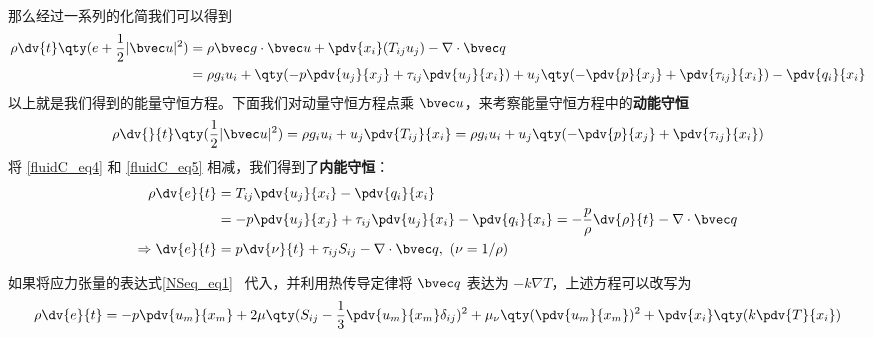 那么经过一系列的化简我们可以得到
\begin{equation}\label{fluidC_eq4}
\begin{aligned}
\rho \dv{t} \qty(e+\frac{1}{2}|\bvec u|^2)&=\rho \bvec g\cdot \bvec u+\pdv{x_i} (T_{ij}u_j)-\nabla\cdot \bvec q\\
&=\rho g_iu_i+\qty(-p\pdv{u_j}{x_j}+\tau_{ij}\pdv{u_j}{x_i})+u_j\qty(-\pdv{p}{x_j}+\pdv{\tau_{ij}}{x_i})-\pdv{q_i}{x_i}
\end{aligned}
\end{equation}
以上就是我们得到的能量守恒方程。下面我们对动量守恒方程点乘 $\bvec u$，来考察能量守恒方程中的\textbf{动能守恒}
\begin{equation}\label{fluidC_eq5}
\rho \dv{}{t}\qty(\frac{1}{2}|\bvec u|^2)=\rho g_iu_i+u_j\pdv{T_{ij}}{x_i}=\rho g_iu_i+u_j\qty(-\pdv{p}{x_j}+\pdv{\tau_{ij}}{x_i})
\end{equation}
将 \autoref{fluidC_eq4} 和 \autoref{fluidC_eq5} 相减，我们得到了\textbf{内能守恒}：
\begin{equation}
\begin{aligned}
\rho \dv{e}{t}&=T_{ij}\pdv{u_j}{x_i}-\pdv{q_i}{x_i}
\\&=-p\pdv{u_j}{x_j}+\tau_{ij}\pdv{u_j}{x_i}-\pdv{q_i}{x_i}=-\frac{p}{\rho}\dv{\rho}{t}-\nabla\cdot \bvec q\\
\Rightarrow \dv{e}{t}&=p\dv{\nu}{t}+\tau_{ij}S_{ij}-\nabla\cdot \bvec q,\ (\nu=1/\rho)\\
\end{aligned}
\end{equation}

如果将应力张量的表达式\autoref{NSeq_eq1}~ 代入，并利用热传导定律将 $\bvec q$ 表达为 $-k\nabla T$，上述方程可以改写为
\begin{equation}\label{fluidC_eq7}
\rho \dv{e}{t}=-p\pdv{u_m}{x_m}+2\mu\qty(S_{ij}-\frac{1}{3}\pdv{u_m}{x_m}\delta_{ij})^2+\mu_\nu\qty(\pdv{u_m}{x_m})^2+\pdv{x_i}\qty(k\pdv{T}{x_i})
\end{equation}
